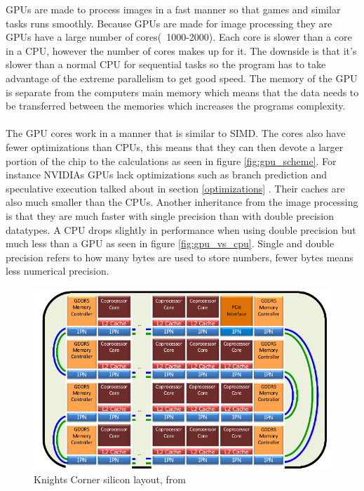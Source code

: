 \documentclass[10pt,a4paper]{report}
\begin{document}
GPUs are made to process images in a fast manner so that games and similar tasks runs smoothly\cite{cuda}. Because GPUs are made for image processing they are GPUs have a large number of cores(~1000-2000)\cite{cuda, nvtesla}. Each core is slower than a core in a CPU, however the number of cores makes up for it. The downside is that it's slower than a normal CPU for sequential tasks so the program has to take advantage of the extreme parallelism to get good speed\cite{cuda_best_practice}. The memory of the GPU is separate from the computers main memory which means that the data needs to be transferred between the memories which increases the programs complexity\cite{cuda}.\\
\\
The GPU cores work in a manner that is similar to SIMD\cite{cuda}. The cores also have fewer optimizations than CPUs, this means that they can then devote a larger portion of the chip to the calculations as seen in figure \ref{fig:gpu_scheme}. For instance NVIDIAs GPUs lack optimizations such as branch prediction and speculative execution talked about in section \ref{optimizations} \cite{cuda}. Their caches are also much smaller than the CPUs\cite{cuda}. Another inheritance from the image processing is that they are much faster with single precision than with double precision datatypes\cite{cuda, nvtesla}. A CPU drops slightly in performance when using double precision but much less than a GPU as seen in figure \ref{fig:gpu_vs_cpu}. Single and double precision refers to how many bytes are used to store numbers, fewer bytes means less numerical precision.

\begin{figure}[h]
    \centering
    \includegraphics[width=12cm]{knigths_corner_silicon_layout.png}
    \caption{Knights Corner silicon layout, from\cite{intel_knights_corner}}
    \label{fig:knights_corner_layout}
\end{figure}
\end{document}
